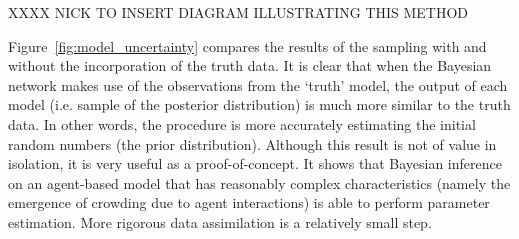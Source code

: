 \documentclass[runningheads]{llncs}
\begin{document}
XXXX NICK TO INSERT DIAGRAM ILLUSTRATING THIS METHOD


Figure~\ref{fig:model_uncertainty} compares the results of the sampling with and without the incorporation of the truth data. It is clear that when the Bayesian network makes use of the observations from the `truth' model, the output of each model (i.e. sample of the posterior distribution) is much more similar to the truth data. In other words, the procedure is more accurately estimating the initial random numbers (the prior distribution). Although this result is not of value in isolation, it is very useful as a proof-of-concept. It shows that Bayesian inference on an agent-based model that has reasonably complex characteristics (namely the emergence of crowding due to agent interactions) is able to perform parameter estimation. More rigorous data assimilation is a relatively small step.

\end{document}
